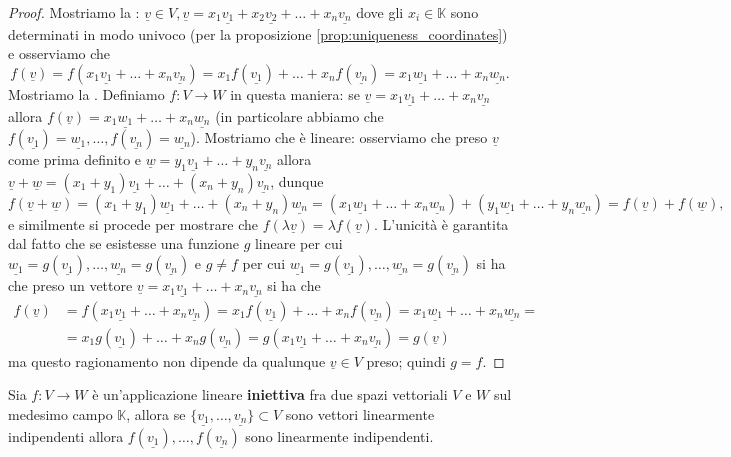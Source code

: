 \begin{proof}
  Mostriamo la : $\underline{v} \in V, \underline{v} = x_1 \underline{v_1} + x_2 \underline{v_2} + \ldots + x_n \underline{v_n}$ dove gli $x_i \in \mathbb{K}$ sono determinati in modo univoco (per la proposizione \ref{prop:uniqueness_coordinates}) e osserviamo che
  $$
    f(\underline{v}) = f(x_1 \underline{v_1}+\ldots+x_n \underline{v_n}) = x_1 f(\underline{v_1}) + \ldots + x_n f(\underline{v_n}) = x_1 \underline{w_1} + \ldots + x_n \underline{w_n}.
  $$
  Mostriamo la . Definiamo $f: V \to W$ in questa maniera: se $\underline{v} = x_1 \underline{v_1} + \ldots + x_n \underline{v_n}$ allora $f(\underline{v}) = x_1 \underline{w_1} + \ldots + x_n \underline{w_n}$ (in particolare abbiamo che $f(\underline{v_1}) = \underline{w_1}, \ldots, f(\underline{v_n}) = \underline{w_n}$). Mostriamo che è lineare: osserviamo che preso $\underline{v}$ come prima definito e $\underline{w} = y_1 \underline{v_1}+\ldots + y_n \underline{v_n}$ allora $\underline{v} + \underline{w} = (x_1 + y_1) \underline{v_1} + \ldots + (x_n + y_n) \underline{v_n}$, dunque
  $$
  f(\underline{v} + \underline{w}) = (x_1 + y_1) \underline{w_1} + \ldots + (x_n + y_n) \underline{w_n} = (x_1 \underline{w_1} + \ldots + x_n \underline{w_n}) + (y_1 \underline{w_1} + \ldots + y_n \underline{w_n}) = f(\underline{v}) + f(\underline{w}),
  $$
  e similmente si procede per mostrare che $f(\lambda \underline{v}) = \lambda f(\underline{v})$. L'unicità è garantita dal fatto che se esistesse una funzione $g$ lineare per cui $\underline{w_1} = g(\underline{v_1}), \ldots, \underline{w_n} = g(\underline{v_n})$ e $g \neq f$ per cui $\underline{w_1} = g(\underline{v_1}), \ldots, \underline{w_n} = g(\underline{v_n})$ si ha che preso un vettore $\underline{v} = x_1 \underline{v_1} + \ldots + x_n \underline{v_n}$ si ha che
  \begin{align}
    f(\underline{v}) &= f(x_1 \underline{v_1} + \ldots + x_n \underline{v_n}) = x_1 f(\underline{v_1}) + \ldots + x_n f(\underline{v_n}) = x_1 \underline{w_1} + \ldots + x_n \underline{w_n} = \\
    &=x_1 g(\underline{v_1}) + \ldots + x_n g(\underline{v_n}) = g(x_1 \underline{v_1} + \ldots + x_n \underline{v_n}) = g(\underline{v})
  \end{align}
  ma questo ragionamento non dipende da qualunque $\underline{v} \in V$ preso; quindi $g = f$.
\end{proof}
\begin{prop}
  \label{prop:iniett_pr_lin_ind}
  Sia $f: V \to W$ è un'applicazione lineare \textbf{iniettiva} fra due spazi vettoriali $V$ e $W$ sul medesimo campo $\mathbb{K}$, allora se $\{ \underline{v_1}, \ldots, \underline{v_n}\} \subset V$ sono vettori linearmente indipendenti allora $f(\underline{v_1}), \ldots, f(\underline{v_n})$ sono linearmente indipendenti.
\end{prop}
